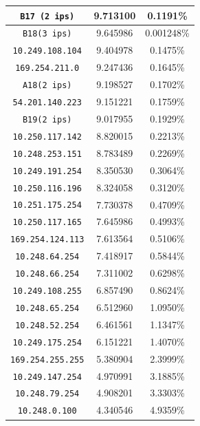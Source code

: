 \documentclass[final,inline,narroweqnarray,a4paper]{ieee}
\begin{document}
\begin{table}[H]
\begin{center}
\begin{tabular}{|c|c|c|}
            \texttt{B17 (2 ips)}    &9.713100 &0.1191\%     \\ \hline 
            \texttt{B18(3 ips)} &9.645986 &0.001248\%     \\ \hline 
            \texttt{10.249.108.104} &9.404978 &0.1475\%     \\ \hline 
            \texttt{169.254.211.0} &9.247436 &0.1645\%     \\ \hline 
            \texttt{A18(2 ips)} &9.198527 &0.1702\%     \\ \hline 
            \texttt{54.201.140.223} &9.151221 &0.1759\%     \\ \hline 
            \texttt{B19(2 ips)} &9.017955 &0.1929\%     \\ \hline 
            \texttt{10.250.117.142} &8.820015 &0.2213\%     \\ \hline 
            \texttt{10.248.253.151} &8.783489 &0.2269\%     \\ \hline 
            \texttt{10.249.191.254} &8.350530 &0.3064\%     \\ \hline 
            \texttt{10.250.116.196} &8.324058 &0.3120\%     \\ \hline 
            \texttt{10.251.175.254} &7.730378 &0.4709\%     \\ \hline 
            \texttt{10.250.117.165} &7.645986 &0.4993\%     \\ \hline 
            \texttt{169.254.124.113} &7.613564 &0.5106\%     \\ \hline 
            \texttt{10.248.64.254} &7.418917 &0.5844\%     \\ \hline 
            \texttt{10.248.66.254} &7.311002 &0.6298\%     \\ \hline 
            \texttt{10.249.108.255} &6.857490 &0.8624\%     \\ \hline 
            \texttt{10.248.65.254} &6.512960 &1.0950\%     \\ \hline 
            \texttt{10.248.52.254} &6.461561 &1.1347\%     \\ \hline 
            \texttt{10.249.175.254} &6.151221 &1.4070\%     \\ \hline 
            \texttt{169.254.255.255} &5.380904 &2.3999\%     \\ \hline 
            \texttt{10.249.147.254} &4.970991 &3.1885\%     \\ \hline 
            \texttt{10.248.79.254} &4.908201 &3.3303\%     \\ \hline 
            \texttt{10.248.0.100} &4.340546 &4.9359\%     \\ \hline 

\end{tabular}
\end{center}
\end{table}
\end{document}
